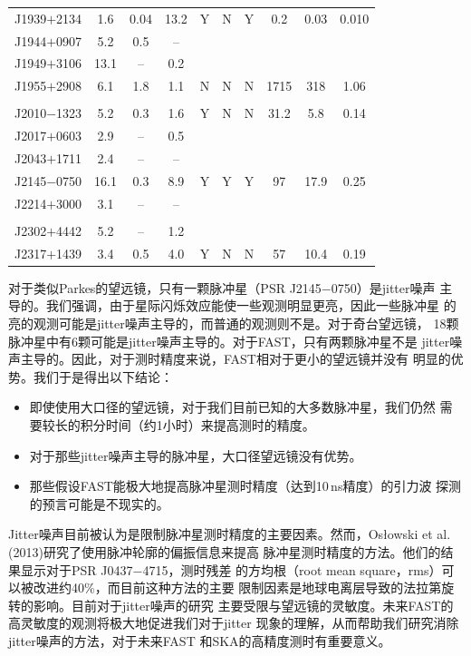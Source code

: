 \begin{table}
\begin{tabular}{lccccccccc}
J1939$+$2134 & 1.6 & 0.04 & 13.2 & Y & N & Y & 0.2 & 0.03 & 0.010 \\
J1944$+$0907 &  5.2& 0.5 & -- \\
J1949$+$3106 & 13.1& -- & 0.2 \\
J1955$+$2908 & 6.1 & 1.8 & 1.1 & N  & N & N & 1715 & 318 & 1.06 \\
\\
J2010$-$1323 & 5.2 & 0.3 & 1.6 & Y & N & N & 31.2 & 5.8 & 0.14 \\
J2017$+$0603 & 2.9 & -- & 0.5 \\
J2043$+$1711 & 2.4 & -- & -- \\
J2145$-$0750 & 16.1& 0.3 & 8.9 & Y  & Y & Y & 97 & 17.9 & 0.25 \\
J2214$+$3000 & 3.1 & -- & -- \\
\\
J2302$+$4442 & 5.2 & -- & 1.2 \\
J2317$+$1439 & 3.4 & 0.5 & 4.0 & Y & N & N & 57 & 10.4 & 0.19 \\
\hline
\end{tabular}
\end{table}

对于类似Parkes的望远镜，只有一颗脉冲星（PSR J2145$-$0750）是jitter噪声
主导的。我们强调，由于星际闪烁效应能使一些观测明显更亮，因此一些脉冲星
的亮的观测可能是jitter噪声主导的，而普通的观测则不是。对于奇台望远镜，
18颗脉冲星中有6颗可能是jitter噪声主导的。对于FAST，只有两颗脉冲星不是
jitter噪声主导的。因此，对于测时精度来说，FAST相对于更小的望远镜并没有
明显的优势。我们于是得出以下结论：
\begin{itemize}
\item 即使使用大口径的望远镜，对于我们目前已知的大多数脉冲星，我们仍然
需要较长的积分时间（约1小时）来提高测时的精度。
\item 对于那些jitter噪声主导的脉冲星，大口径望远镜没有优势。
\item 那些假设FAST能极大地提高脉冲星测时精度（达到10\,ns精度）的引力波
探测的预言可能是不现实的。
\end{itemize}

Jitter噪声目前被认为是限制脉冲星测时精度的主要因素。然而，Os{\l}owski 
et al. (2013)\supercite{Oslowski13}研究了使用脉冲轮廓的偏振信息来提高
脉冲星测时精度的方法。他们的结果显示对于PSR J0437$-$4715，测时残差
的方均根（root mean square，rms）可以被改进约40\%，而目前这种方法的主要
限制因素是地球电离层导致的法拉第旋转的影响。目前对于jitter噪声的研究
主要受限与望远镜的灵敏度。未来FAST的高灵敏度的观测将极大地促进我们对于jitter
现象的理解，从而帮助我们研究消除jitter噪声的方法，对于未来FAST
和SKA的高精度测时有重要意义。

